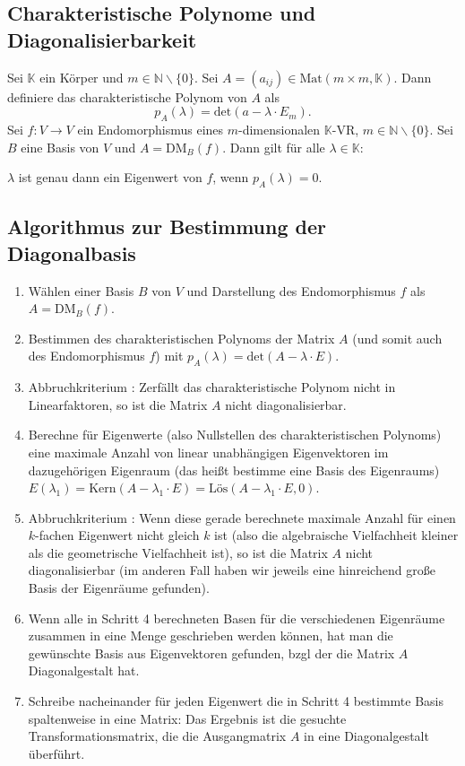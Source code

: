 \documentclass[a4paper,12pt]{article}
\newcommand{\RN}[1]{\uppercase\expandafter{\romannumeral#1}}
\numberwithin{equation}{section}
\begin{document}
\subsection{Charakteristische Polynome und Diagonalisierbarkeit}
Sei $\mathbb{K}$ ein Körper und $m \in \mathbb{N}\backslash\{0\}$. Sei $A=\left(a_{ij}\right) \in \text{Mat}\left(m\times m,\mathbb{K}\right)$. Dann definiere das charakteristische Polynom von $A$ als
\[ 
        p_A\left(\lambda \right)=\text{det}\left(a-\lambda \cdot E_m\right)
.\] 
Sei $f:V\rightarrow V$ ein Endomorphismus eines $m$-dimensionalen $\mathbb{K}$-VR, $m \in \mathbb{N}\backslash\{0\}$. Sei $B$ eine Basis von $V$ und $A=\text{DM}_B\left(f\right)$. Dann gilt für alle $\lambda  \in \mathbb{K}$:
\begin{center}
        $\lambda $ ist genau dann ein Eigenwert von $f$, wenn $p_A\left(\lambda \right)=0$.
\end{center}

\subsection{Algorithmus zur Bestimmung der Diagonalbasis}
\begin{enumerate}[label=(\arabic*)]
        \item Wählen einer Basis $B$ von $V$ und Darstellung des Endomorphismus $f$ als $A=\text{DM}_B\left(f\right)$.
        \item Bestimmen des charakteristischen Polynoms der Matrix $A$ (und somit auch des Endomorphismus $f$) mit $p_A\left(\lambda \right)=\text{det}\left(A-\lambda \cdot E\right)$.
        \item Abbruchkriterium \RN1: Zerfällt das charakteristische Polynom nicht in Linearfaktoren, so ist die Matrix $A$ nicht diagonalisierbar.
        \item Berechne für Eigenwerte (also Nullstellen des charakteristischen Polynoms) eine maximale Anzahl von linear unabhängigen Eigenvektoren im dazugehörigen Eigenraum (das heißt bestimme eine Basis des Eigenraums) $E\left(\lambda _1\right)=\text{Kern}\left(A-\lambda _1\cdot E\right)=\text{Lös}\left(A-\lambda _1\cdot E,0\right)$.
        \item Abbruchkriterium \RN2: Wenn diese gerade berechnete maximale Anzahl für einen $k$-fachen Eigenwert nicht gleich $k$ ist (also die algebraische Vielfachheit kleiner als die geometrische Vielfachheit ist), so ist die Matrix $A$ nicht diagonalisierbar (im anderen Fall haben wir jeweils eine hinreichend große Basis der Eigenräume gefunden). 
        \item Wenn alle in Schritt 4 berechneten Basen für die verschiedenen Eigenräume zusammen in eine Menge geschrieben werden können, hat man die gewünschte Basis aus Eigenvektoren gefunden, bzgl der die Matrix $A$ Diagonalgestalt hat.
        \item Schreibe nacheinander für jeden Eigenwert die in Schritt 4 bestimmte Basis spaltenweise in eine Matrix: Das Ergebnis ist die gesuchte Transformationsmatrix, die die Ausgangmatrix $A$ in eine Diagonalgestalt überführt.
\end{enumerate}
\end{document}
